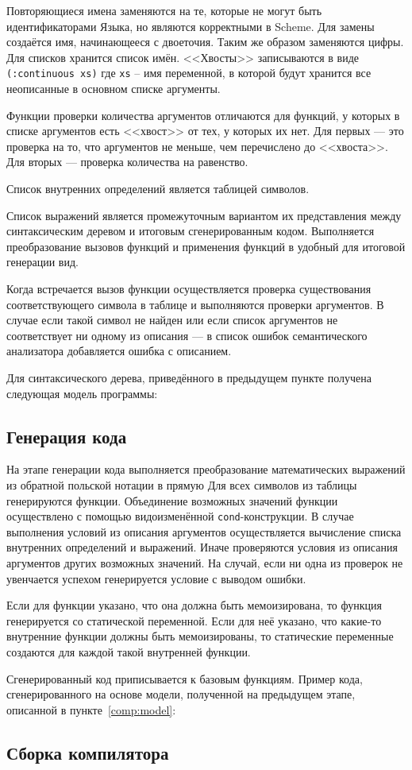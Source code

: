     Повторяющиеся имена заменяются на те, которые не могут быть идентификаторами Языка, но являются корректными в Scheme.
    Для замены создаётся имя, начинающееся с двоеточия.
    Таким же образом заменяются цифры.
    Для списков хранится список имён.
    <<Хвосты>> записываются в виде \verb,(:continuous xs), где \verb/xs/ -- имя переменной, в которой будут хранится все неописанные в основном списке аргументы.

    Функции проверки количества аргументов отличаются для функций, у которых в списке аргументов есть <<хвост>> от тех, у которых их нет.
    Для первых --- это проверка на то, что аргументов не меньше, чем перечислено до <<хвоста>>.
    Для вторых --- проверка количества на равенство.

    Список внутренних определений является таблицей символов.

    Список выражений является промежуточным вариантом их представления между синтаксическим деревом и итоговым сгенерированным кодом.
    Выполняется преобразование вызовов функций и применения функций в удобный для итоговой генерации вид.

    Когда встречается вызов функции осуществляется проверка существования соответствующего символа в таблице и выполняются проверки аргументов.
    В случае если такой символ не найден или если список аргументов не соответствует ни одному из описания --- в список ошибок семантического анализатора добавляется ошибка с описанием.

    Для синтаксического дерева, приведённого в предыдущем пункте получена следующая модель программы:
    
    
    
    \subsection{Генерация кода}
    На этапе генерации кода выполняется преобразование математических выражений из обратной польской нотации в прямую
    Для всех символов из таблицы генерируются функции.
    Объединение возможных значений функции осуществлено с помощью видоизменённой \verb$cond$-конструкции.
    В случае выполнения условий из описания аргументов осуществляется вычисление списка внутренних определений и выражений.
    Иначе проверяются условия из описания аргументов других возможных значений.
    На случай, если ни одна из проверок не увенчается успехом генерируется условие с выводом ошибки.

    Если для функции указано, что она должна быть мемоизирована, то функция генерируется со статической переменной.
    Если для неё указано, что какие-то внутренние функции должны быть мемоизированы, то статические переменные создаются для каждой такой внутренней функции.

    Сгенерированный код приписывается к базовым функциям.
    \clearpage
    Пример кода, сгенерированного на основе модели, полученной на предыдущем этапе, описанной в пункте~\ref{comp:model}:

    

    \subsection{Сборка компилятора}
